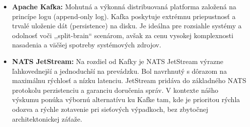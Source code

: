 \begin{itemize}
\item \textbf{Apache Kafka:} Mohutná a výkonná distribuovaná platforma založená na princípe logu (append-only log). Kafka poskytuje extrémnu priepustnosť a trvalé uloženie dát (persistence) na disku. Je ideálna pre rozsiahle systémy a odolnosť voči ,,split-brain`` scenárom, avšak za cenu vysokej komplexnosti nasadenia a väčšej spotreby systémových zdrojov.
\item \textbf{NATS JetStream:} Na rozdiel od Kafky je NATS JetStream výrazne ľahkovednejší a jednoduchší na prevádzku. Bol navrhnutý s dôrazom na maximálnu rýchlosť a nízku latenciu. JetStream pridáva do základného NATS protokolu perzistenciu a garanciu doručenia správ. V kontexte nášho výskumu ponúka výbornú alternatívu ku Kafke tam, kde je prioritou rýchla odozva a rýchle zotavenie pri sieťových výpadkoch, bez zbytočnej architektonickej záťaže.
\end{itemize}